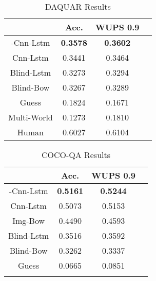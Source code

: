 \documentclass{article}
\renewcommand{\#}[1]{\textbf{#1}}
\begin{document}
\begin{table}[h]
\caption{DAQUAR Results}
\label{tab:cocoqa_results}
\vskip 0.15in
\begin{center}
\begin{small}
\begin{sc}
\begin{tabular}{c c c c}
\hline
\abovespace
\belowspace
            & Acc.     & WUPS 0.9 \\
\hline
\abovespace
2-Cnn-Lstm  &\#{0.3578}&\#{0.3602}\\
Cnn-Lstm    & 0.3441   & 0.3464   \\
Blind-Lstm  & 0.3273   & 0.3294   \\
Blind-Bow   & 0.3267   & 0.3289   \\
Guess       & 0.1824   & 0.1671   \\
\belowspace
Multi-World & 0.1273   & 0.1810   \\
\hline
\abovespace
\belowspace
Human       & 0.6027   &  0.6104  \\
\hline
\end{tabular}
\end{sc}
\end{small}
\end{center}
\end{table}

\begin{table}[h]
\caption{COCO-QA Results}
\label{tab:cocoqa_results}
\vskip 0.15in
\begin{center}
\begin{small}
\begin{sc}
\begin{tabular}{c c c c}
\hline
\abovespace\belowspace
           & Acc.     & WUPS 0.9 \\
\hline
\abovespace
2-Cnn-Lstm &\#{0.5161}&\#{0.5244}\\
Cnn-Lstm   & 0.5073   & 0.5153   \\
Img-Bow    & 0.4490   & 0.4593   \\
Blind-Lstm & 0.3516   & 0.3592   \\
Blind-Bow  & 0.3262   & 0.3337   \\
\belowspace
Guess      & 0.0665   & 0.0851   \\
\hline
\abovespace
\end{tabular}
\end{sc}
\end{small}
\end{center}
\end{table}
\end{document}
